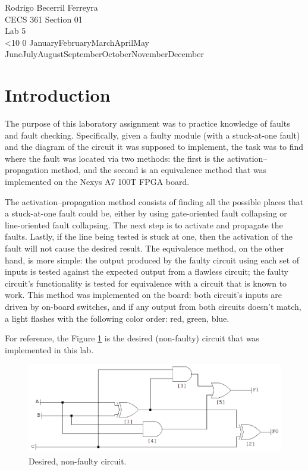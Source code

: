 \documentclass{article}
\renewcommand{\today}{\ifnum\number\day<10 0\fi \number\day \space%
\ifcase \month \or January\or February\or March\or April\or May%
\or June\or July\or August\or September\or October\or November\or December\fi\space%
\number \year}
\begin{document}
\noindent
Rodrigo Becerril Ferreyra\\
CECS 361 Section 01\\
Lab 5\\
\today

\section{Introduction} The purpose of this laboratory assignment
was to practice knowledge of faults and fault checking.
Specifically, given a faulty module
(with a stuck-at-one fault)
and the diagram of the
circuit it was supposed to implement, the task was to find where
the fault was located via two methods: the first
is the activation--propagation method, and the second is
an equivalence method that was implemented on the Nexys A7
100T FPGA board.

The activation--propagation method consists of
finding all the possible places that a stuck-at-one fault could
be, either by using gate-oriented fault collapsing or
line-oriented fault collapsing. The next step is to activate
and propagate the faults. Lastly, if the line being tested
is stuck at one, then the activation of the fault will not
cause the desired result. The equivalence method, on the other
hand, is more simple:
the output produced by the faulty circuit
using each set of inputs is
tested against the expected output from a flawless circuit;
the faulty circuit's functionality is tested for equivalence
with a circuit that is known to work. This method was
implemented on the board: both circuit's inputs are driven
by on-board switches, and if any output from both circuits
doesn't match, a light flashes with the following color order:
red, green, blue.

For reference, the Figure \ref{diagram:original}
is the desired (non-faulty) circuit
that was implemented in this lab.

\begin{figure}[H]
    \centering
    \includegraphics[width=\textwidth]{Images/Circuit_diagram_clean}
    \caption{Desired, non-faulty circuit.}
    \label{diagram:original}
\end{figure}
\end{document}
